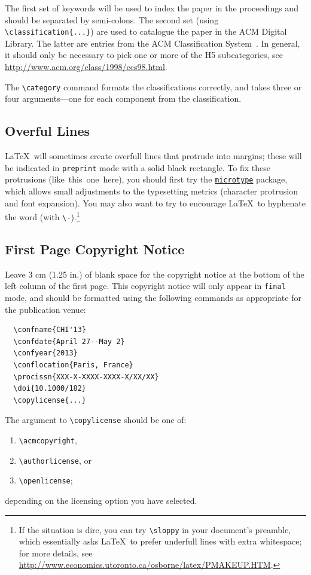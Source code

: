 \documentclass[preprint]{../latex/sigchi-modern}
\begin{document}
The first set of keywords will be used to index the paper in the proceedings and
should be separated by semi-colons. The second set (using
\texttt{\textbackslash classification\{...\}}) are used to catalogue the paper
in the ACM Digital Library. The latter are entries from the ACM Classification
System~\cite{acm_categories}. In general, it should only be necessary to pick
one or more of the H5 subcategories, see
\url{http://www.acm.org/class/1998/ccs98.html}.

The \texttt{\textbackslash category} command formats the classifications 
correctly, and takes three or four arguments---one for each component from the
classification.

\subsection{Overful Lines}
\LaTeX\ will sometimes create overfull lines that protrude into margins; these
will be indicated in \texttt{preprint} mode with a solid black rectangle. To fix
these protrusions (like~this~one~here), you should first try the
\href{http://ctan.org/pkg/microtype}{\texttt{microtype}} package, which allows
small adjustments to the typesetting metrics (character protrusion and font
expansion). You may also want to try to encourage \LaTeX\ to hyphenate the word
(with \texttt{\textbackslash -}).\footnote{If the situation is dire, you can try
\texttt{\textbackslash sloppy} in your document's preamble, which essentially
asks \LaTeX\ to prefer underfull lines with extra whitespace; for more details,
see \url{http://www.economics.utoronto.ca/osborne/latex/PMAKEUP.HTM}.}

\subsection{First Page Copyright Notice}
Leave 3 cm (1.25 in.) of blank space for the copyright notice at the bottom of
the left column of the first page. This copyright notice will only appear in
\texttt{final} mode, and should be formatted using the following commands as
appropriate for the publication venue:
\begin{verbatim}
  \confname{CHI'13}
  \confdate{April 27--May 2}
  \confyear{2013}
  \conflocation{Paris, France}
  \procissn{XXX-X-XXXX-XXXX-X/XX/XX}
  \doi{10.1000/182}
  \copylicense{...}
\end{verbatim}

The argument to \texttt{\textbackslash copylicense} should be one of:
\begin{enumerate}
  \item\texttt{\textbackslash acmcopyright}, 
  \item\texttt{\textbackslash authorlicense}, or 
  \item\texttt{\textbackslash openlicense}; 
\end{enumerate}
depending on the licensing option you have selected.
\end{document}
